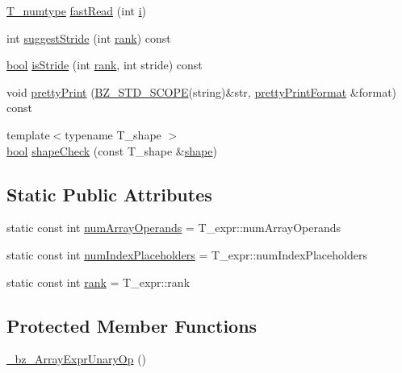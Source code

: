 \begin{DoxyCompactItemize}
\item 
\hyperlink{class__bz__ArrayExprUnaryOp_a89bf264c814e1fa55026c4389ad34085}{T\+\_\+numtype} \hyperlink{class__bz__ArrayExprUnaryOp_a50201cfbb3373d383a9a8a8c042f0c9a}{fast\+Read} (int \hyperlink{indexexpr_8h_aabd77643995707c185e95c8cb2782c81}{i})
\item 
int \hyperlink{class__bz__ArrayExprUnaryOp_a2b60f5de2b62a217a3a648e317a3b84b}{suggest\+Stride} (int \hyperlink{class__bz__ArrayExprUnaryOp_aa736afcc97edc921e07290cb8c822555}{rank}) const 
\item 
\hyperlink{compiler_8h_abb452686968e48b67397da5f97445f5b}{bool} \hyperlink{class__bz__ArrayExprUnaryOp_a34cdb09e5c92fd137d8353b9679349f0}{is\+Stride} (int \hyperlink{class__bz__ArrayExprUnaryOp_aa736afcc97edc921e07290cb8c822555}{rank}, int stride) const 
\item 
void \hyperlink{class__bz__ArrayExprUnaryOp_a80197e6c0840b4244fcee388adc7e2a0}{pretty\+Print} (\hyperlink{numinquire_8h_a2b24ffc3b4ef9803956bc7715c6c7b83}{B\+Z\+\_\+\+S\+T\+D\+\_\+\+S\+C\+O\+P\+E}(string)\&str, \hyperlink{classprettyPrintFormat}{pretty\+Print\+Format} \&format) const 
\item 
{\footnotesize template$<$typename T\+\_\+shape $>$ }\\\hyperlink{compiler_8h_abb452686968e48b67397da5f97445f5b}{bool} \hyperlink{class__bz__ArrayExprUnaryOp_a9839d1f4012cf45ab4a5f4423326cab2}{shape\+Check} (const T\+\_\+shape \&\hyperlink{shape_8h_a9d9da3dcaecbbde6cf1961063f2e838b}{shape})
\end{DoxyCompactItemize}
\subsection*{Static Public Attributes}
\begin{DoxyCompactItemize}
\item 
static const int \hyperlink{class__bz__ArrayExprUnaryOp_a045c62331f2ffbee4d7ab1ae85cb9d9e}{num\+Array\+Operands} = T\+\_\+expr\+::num\+Array\+Operands
\item 
static const int \hyperlink{class__bz__ArrayExprUnaryOp_a74abfacc0bb852c8efd879b2e8a4ea77}{num\+Index\+Placeholders} = T\+\_\+expr\+::num\+Index\+Placeholders
\item 
static const int \hyperlink{class__bz__ArrayExprUnaryOp_aa736afcc97edc921e07290cb8c822555}{rank} = T\+\_\+expr\+::rank
\end{DoxyCompactItemize}
\subsection*{Protected Member Functions}
\begin{DoxyCompactItemize}
\item 
\hyperlink{class__bz__ArrayExprUnaryOp_aad56d428943012340401070df0ff84c8}{\+\_\+bz\+\_\+\+Array\+Expr\+Unary\+Op} ()
\end{DoxyCompactItemize}
